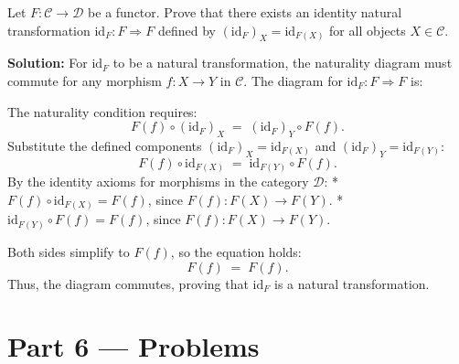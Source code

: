 \documentclass[12pt, a4paper]{article}
\begin{document}
\begin{enumerate}[label=\textbf{E\arabic*.}]
        Let $F: \mathcal{C} \to \mathcal{D}$ be a functor.
        Prove that there exists an identity natural transformation $\text{id}_F: F \Rightarrow F$ defined by $(\text{id}_F)_X = \text{id}_{F(X)}$ for all objects $X \in \mathcal{C}$.
        
        \textbf{Solution:}
        For $\text{id}_F$ to be a natural transformation, the naturality diagram must commute for any morphism $f: X \to Y$ in $\mathcal{C}$.
        The diagram for $\text{id}_F: F \Rightarrow F$ is:
        \begin{center}
        \end{center}
        The naturality condition requires:
        \[
          F(f) \circ (\text{id}_F)_X \;=\; (\text{id}_F)_Y \circ F(f).
        \]
        Substitute the defined components $(\text{id}_F)_X = \text{id}_{F(X)}$ and $(\text{id}_F)_Y = \text{id}_{F(Y)}$:
        \[
          F(f) \circ \text{id}_{F(X)} \;=\; \text{id}_{F(Y)} \circ F(f).
        \]
        By the identity axioms for morphisms in the category $\mathcal{D}$:
        * $F(f) \circ \text{id}_{F(X)} = F(f)$, since $F(f): F(X) \to F(Y)$.
        * $\text{id}_{F(Y)} \circ F(f) = F(f)$, since $F(f): F(X) \to F(Y)$.
        
        Both sides simplify to $F(f)$, so the equation holds:
        \[
          F(f) \;=\; F(f).
        \]
        Thus, the diagram commutes, proving that $\text{id}_F$ is a natural transformation.
\end{enumerate}

\newpage

\section{Part 6 --- Problems}
\end{document}
